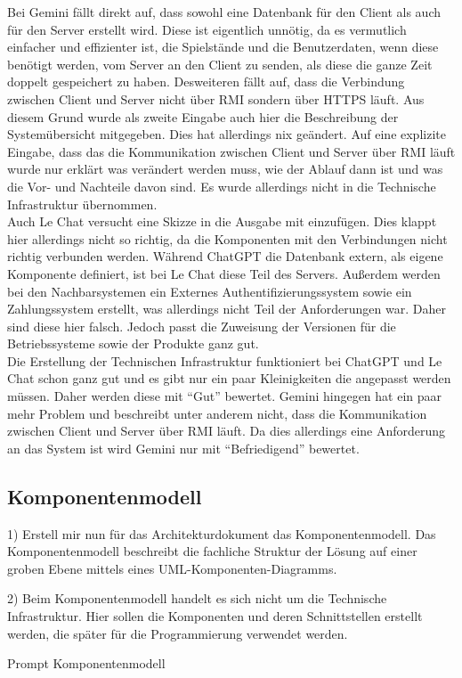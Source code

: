 Bei Gemini fällt direkt auf, dass sowohl eine Datenbank für den Client als auch für den Server erstellt wird. Diese ist eigentlich unnötig, da es vermutlich 
einfacher und effizienter ist, die Spielstände und die Benutzerdaten, wenn diese benötigt werden, vom Server an den Client zu senden, als diese die ganze 
Zeit doppelt gespeichert zu haben. Desweiteren fällt auf, dass die Verbindung zwischen Client und Server nicht über RMI sondern über HTTPS läuft. Aus diesem 
Grund wurde als zweite Eingabe auch hier die Beschreibung der Systemübersicht mitgegeben. Dies hat allerdings nix geändert. Auf eine explizite Eingabe, dass 
das die Kommunikation zwischen Client und Server über RMI läuft wurde nur erklärt was verändert werden muss, wie der Ablauf dann ist und was die Vor- und 
Nachteile davon sind. Es wurde allerdings nicht in die Technische Infrastruktur übernommen.\\

Auch Le Chat versucht eine Skizze in die Ausgabe mit einzufügen. Dies klappt hier allerdings nicht so richtig, da die Komponenten mit den Verbindungen nicht 
richtig verbunden werden. Während ChatGPT die Datenbank extern, als eigene Komponente definiert, ist bei Le Chat diese Teil des Servers. Außerdem werden bei den
Nachbarsystemen ein Externes Authentifizierungssystem sowie ein Zahlungssystem erstellt, was allerdings nicht Teil der Anforderungen war. Daher sind diese hier 
falsch. Jedoch passt die Zuweisung der Versionen für die Betriebssysteme sowie der Produkte ganz gut.\\

Die Erstellung der Technischen Infrastruktur funktioniert bei ChatGPT und Le Chat schon ganz gut und es gibt nur ein paar Kleinigkeiten die angepasst 
werden müssen. Daher werden diese mit ``Gut'' bewertet. Gemini hingegen hat ein paar mehr Problem und beschreibt unter anderem nicht, dass die 
Kommunikation zwischen Client und Server über RMI läuft. Da dies allerdings eine Anforderung an das System ist wird Gemini nur mit ``Befriedigend''
bewertet.

\subsection*{Komponentenmodell}

\begin{prompt}[H]
    \begin{tcolorbox}[colback=gray!20, colframe=gray!20, boxrule=0pt, sharp corners] 
        1) Erstell mir nun für das Architekturdokument das Komponentenmodell. Das Komponentenmodell beschreibt die fachliche Struktur der Lösung auf 
        einer groben Ebene mittels eines UML-Komponenten-Diagramms.
        
        2) Beim Komponentenmodell handelt es sich nicht um die Technische Infrastruktur. Hier sollen die Komponenten und deren Schnittstellen erstellt 
        werden, die später für die Programmierung verwendet werden.
        \vfill
    \end{tcolorbox}
    \caption{Prompt Komponentenmodell}
    \label{Prompt Komponentenmodell}
\end{prompt}

